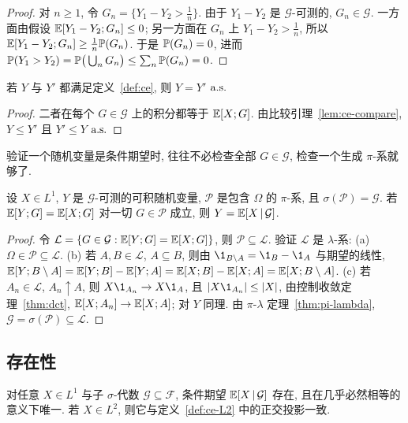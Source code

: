 \begin{proof}
对 $n\ge1$, 令 $G_n=\{Y_1-Y_2>\frac{1}{n}\}$. 由于 $Y_1-Y_2$ 是 $\mathcal{G}$-可测的, $G_n\in\mathcal{G}$. 一方面由假设 $\E[Y_1-Y_2;G_n]\le0$; 另一方面在 $G_n$ 上 $Y_1-Y_2>\frac{1}{n}$, 所以 $\E[Y_1-Y_2;G_n]\ge\frac{1}{n}\P(G_n)$. 于是 $\P(G_n)=0$, 进而
$\P(Y_1>Y_2)=\P\big(\bigcup_nG_n\big)\le\sum_n\P(G_n)=0$.
\end{proof}

\begin{corollary}[唯一性]\label{cor:ce-uniqueness}
若 $Y$ 与 $Y'$ 都满足定义~\ref{def:ce}, 则 $Y=Y'$ $\as$
\end{corollary}

\begin{proof}
二者在每个 $G\in\mathcal{G}$ 上的积分都等于 $\E[X;G]$. 由比较引理~\ref{lem:ce-compare}, $Y\le Y'$ 且 $Y'\le Y$ $\as$
\end{proof}

验证一个随机变量是条件期望时, 往往不必检查全部 $G\in\mathcal{G}$, 检查一个生成 $\pi$-系就够了.

\begin{lemma}\label{lem:ce-pi-system}
设 $X\in L^1$, $Y$ 是 $\mathcal{G}$-可测的可积随机变量, $\mathcal{P}$ 是包含 $\Omega$ 的 $\pi$-系, 且 $\sigma(\mathcal{P})=\mathcal{G}$. 若 $\E[Y;G]=\E[X;G]$ 对一切 $G\in\mathcal{P}$ 成立, 则 $Y=\E[X\,|\,\mathcal{G}]$.
\end{lemma}

\begin{proof}
令 $\mathcal{L}=\{G\in\mathcal{G}: \E[Y;G]=\E[X;G]\}$, 则 $\mathcal{P}\subseteq\mathcal{L}$. 验证 $\mathcal{L}$ 是 $\lambda$-系: (a) $\Omega\in\mathcal{P}\subseteq\mathcal{L}$. (b) 若 $A,B\in\mathcal{L}$, $A\subseteq B$, 则由 $\1_{B\setminus A}=\1_B-\1_A$ 与期望的线性, $\E[Y;B\setminus A]=\E[Y;B]-\E[Y;A]=\E[X;B]-\E[X;A]=\E[X;B\setminus A]$. (c) 若 $A_n\in\mathcal{L}$, $A_n\uparrow A$, 则 $X\1_{A_n}\to X\1_A$, 且 $\abs{X\1_{A_n}}\le\abs{X}$, 由控制收敛定理~\ref{thm:dct}, $\E[X;A_n]\to\E[X;A]$; 对 $Y$ 同理. 由 $\pi$-$\lambda$ 定理~\ref{thm:pi-lambda}, $\mathcal{G}=\sigma(\mathcal{P})\subseteq\mathcal{L}$.
\end{proof}

\subsection{存在性}

\begin{theorem}[条件期望的存在唯一性]\label{thm:ce-existence}
对任意 $X\in L^1$ 与子 $\sigma$-代数 $\mathcal{G}\subseteq\mathcal{F}$, 条件期望 $\E[X\,|\,\mathcal{G}]$ 存在, 且在几乎必然相等的意义下唯一. 若 $X\in L^2$, 则它与定义~\ref{def:ce-L2} 中的正交投影一致.
\end{theorem}

